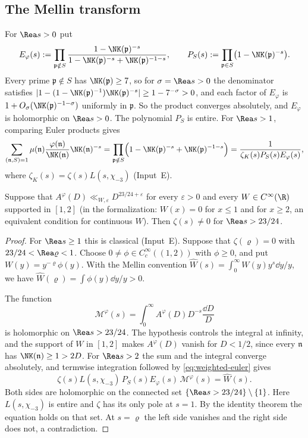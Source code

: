 \subsection{The Mellin transform}
For $\Rea s>0$ put
\[
 E_\varphi(s):=\prod_{\mathfrak p\notin S}
 \frac{1-\NK(\mathfrak p)^{-s}}{1-\NK(\mathfrak p)^{-s}+\NK(\mathfrak p)^{-1-s}},
 \qquad
 P_S(s):=\prod_{\mathfrak p\in S}\bigl(1-\NK(\mathfrak p)^{-s}\bigr).
\]
Every prime $\mathfrak p\notin S$ has $\NK(\mathfrak p)\ge7$, so for $\sigma=\Rea s>0$ the
denominator satisfies
$|1-(1-\NK(\mathfrak p)^{-1})\NK(\mathfrak p)^{-s}|\ge1-7^{-\sigma}>0$, and each factor of
$E_\varphi$ is $1+O_\sigma(\NK(\mathfrak p)^{-1-\sigma})$ uniformly in $\mathfrak p$. So the product converges absolutely, and $E_\varphi$ is
holomorphic on $\Rea s>0$. The polynomial $P_S$ is entire. For $\Rea s>1$, comparing Euler
products gives
\begin{equation}\label{eq:weighted-euler}
 \sum_{(\mathfrak n,S)=1}\mu(\mathfrak n)\frac{\varphi(\mathfrak n)}{\NK(\mathfrak n)}\NK(\mathfrak n)^{-s}
 =\prod_{\mathfrak p\notin S}\Bigl(1-\NK(\mathfrak p)^{-s}+\NK(\mathfrak p)^{-1-s}\Bigr)
 =\frac1{\zeta_K(s)P_S(s)E_\varphi(s)},
\end{equation}
where $\zeta_K(s)=\zeta(s)L(s,\chi_{-3})$ (Input~E).

\begin{proposition}\label{prop:mellin}
Suppose that $A^\varphi(D)\ll_{W,\varepsilon}D^{23/24+\varepsilon}$ for every $\varepsilon>0$ and
every $W\in C^\infty(\R)$ supported in $[1,2]$ (in the formalization: $W(x)=0$ for $x\le1$ and
for $x\ge2$, an equivalent condition for continuous $W$). Then $\zeta(s)\ne0$ for
$\Rea s>23/24$.
\end{proposition}

\begin{proof}
For $\Rea s\ge1$ this is classical (Input~E). Suppose that $\zeta(\varrho)=0$ with
$23/24<\Rea\varrho<1$. Choose $0\ne\phi\in C_c^\infty((1,2))$ with $\phi\ge0$, and put
$W(y)=y^{-\varrho}\phi(y)$. With the Mellin convention
$\widehat W(s)=\int_0^\infty W(y)y^s\dd y/y$, we have
$\widehat W(\varrho)=\int\phi(y)\dd y/y>0$.

The function
\[
 \mathcal M^\varphi(s)=\int_0^\infty A^\varphi(D)D^{-s}\frac{\dd D}{D}
\]
is holomorphic on $\Rea s>23/24$. The hypothesis controls the integral at infinity, and the
support of $W$ in $[1,2]$ makes $A^\varphi(D)$ vanish for $D<1/2$, since every $\mathfrak n$
has $\NK(\mathfrak n)\ge1>2D$. For $\Rea s>2$ the sum and the integral converge absolutely, and
termwise integration followed by \eqref{eq:weighted-euler} gives
\[
 \zeta(s)L(s,\chi_{-3})\,P_S(s)E_\varphi(s)\,\mathcal M^\varphi(s)=\widehat W(s).
\]
Both sides are holomorphic on the connected set $\{\Rea s>23/24\}\setminus\{1\}$. Here
$L(s,\chi_{-3})$ is entire and $\zeta$ has its only pole at $s=1$. By the identity theorem
the equation holds on that set. At $s=\varrho$ the left side vanishes and the right side does
not, a contradiction.
\end{proof}

